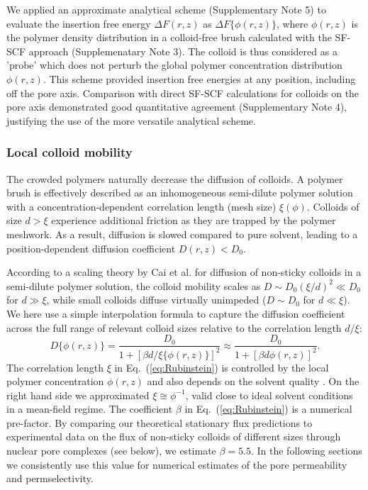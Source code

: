 \documentclass[12pt, a4paper]{article}
\begin{document}
We applied an approximate analytical scheme (Supplementary Note 5) to evaluate the insertion free energy $\Delta F(r,z)$ as $\Delta F\{\phi(r,z)\}$, where $\phi(r,z)$ is the polymer density distribution in a colloid-free brush calculated with the SF-SCF approach (Supplemenatary Note 3).
The colloid is thus considered as a 'probe' which does not perturb the global polymer concentration distribution $\phi(r,z)$.
This scheme provided insertion free energies at any position, including off the pore axis.
Comparison with direct SF-SCF calculations for colloids on the pore axis demonstrated good quantitative agreement (Supplementary Note 4), justifying the use of the more versatile analytical scheme.


\subsubsection{Local colloid mobility}

The crowded polymers naturally decrease the diffusion of colloids.
A polymer brush is effectively described as an inhomogeneous semi-dilute polymer solution with a concentration-dependent correlation length (mesh size) $\xi(\phi)$.
Colloids of size $d > \xi$ experience additional friction as they are trapped by the polymer meshwork.
As a result, diffusion is slowed compared to pure solvent, leading to a position-dependent diffusion coefficient $D(r,z) < D_0$.

According to a scaling theory by Cai et al. \cite{Cai2011} for diffusion of non-sticky colloids in a semi-dilute polymer solution, the colloid mobility scales as $D\sim D_0 (\xi/d)^2\ll D_0$ for $d\gg \xi$, while small colloids diffuse virtually unimpeded ($D\sim D_0$ for $d\ll \xi$). We here use a simple interpolation formula to capture the diffusion coefficient across the full range of relevant colloid sizes relative to the correlation length $d / \xi$:
\begin{equation}
    D\{\phi(r,z)\} = \frac{D_0}{1+[\beta d / \xi\{\phi(r,z)\}]^2} \approx \frac{D_0}{1+[\beta d \phi(r,z)]^2} .
    \label{eq:Rubinstein}
\end{equation}
The correlation length $\xi$ in Eq.~(\ref{eq:Rubinstein}) is controlled by the local polymer concentration $\phi(r,z)$ and also depends on the solvent quality \cite{DeGennes1979}.
On the right hand side we approximated $\xi \cong \phi^{-1}$, valid close to ideal solvent conditions in a mean-field regime.
The coefficient $\beta$ in Eq.~(\ref{eq:Rubinstein}) is a numerical pre-factor.
By comparing our theoretical stationary flux predictions to experimental data on the flux of non-sticky colloids of different sizes through nuclear pore complexes (see below), we estimate $\beta = 5.5$.
In the following sections we consistently use this value for numerical estimates of the pore permeability and permselectivity.
\end{document}
